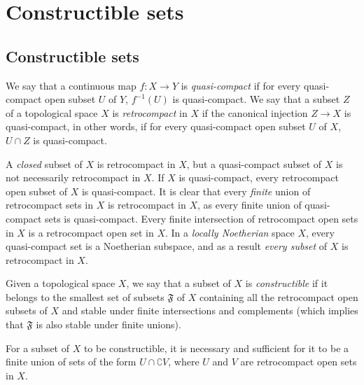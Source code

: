 \section{Constructible sets}
\label{section:0.9}

\subsection{Constructible sets}
\label{subsection:0.9.1}

\begin{definition}[9.1.1]
\label{0.9.1.1}
We say that a continuous map $f:X\to Y$ is \emph{quasi-compact} if for every quasi-compact open subset $U$ of $Y$, $f^{-1}(U)$ is quasi-compact.
We say that a subset $Z$ of a topological space $X$ is \emph{retrocompact} in $X$ if the canonical injection $Z\to X$ is quasi-compact, in other words, if for every quasi-compact open subset $U$ of $X$, $U\cap Z$ is quasi-compact.
\end{definition}

A \emph{closed} subset of $X$ is retrocompact in $X$, but a quasi-compact subset of $X$ is not necessarily retrocompact in $X$.
If $X$ is quasi-compact, every retrocompact open subset of $X$ is quasi-compact.
It is clear that every \emph{finite} union of retrocompact sets in $X$ is retrocompact in $X$, as every finite union of quasi-compact sets is quasi-compact.
Every finite intersection of retrocompact open sets in $X$ is a retrocompact open set in $X$.
In a \emph{locally Noetherian} space $X$, every quasi-compact set is a Noetherian subspace, and as a result \emph{every subset} of $X$ is retrocompact in $X$.

\begin{definition}[9.1.2]
\label{0.9.1.2}
Given a topological space $X$, we say that a subset of $X$ is \emph{constructible} if it belongs to the smallest set of subsets $\mathfrak{F}$ of $X$ containing all the retrocompact open subsets of $X$ and stable under finite intersections and complements (which implies that $\mathfrak{F}$ is also stable under finite unions).
\end{definition}

\begin{proposition}[9.1.3]
\label{0.9.1.3}
For a subset of $X$ to be constructible, it is necessary and sufficient for it to be a finite union of sets of the form $U\cap\complement{V}$, where $U$ and $V$ are retrocompact open sets in $X$.
\end{proposition}

